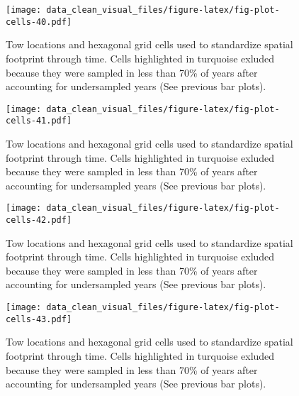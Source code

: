 \documentclass[
]{article}
\begin{document}
\begin{figure}
\centering
\texttt{[image: data\_clean\_visual\_files/figure-latex/fig-plot-cells-40.pdf]}
\caption{\label{fig:fig-plot-cells-40}Tow locations and hexagonal grid cells used to standardize spatial footprint through time. Cells highlighted in turquoise exluded because they were sampled in less than 70\% of years after accounting for undersampled years (See previous bar plots).}
\end{figure}

\begin{figure}
\centering
\texttt{[image: data\_clean\_visual\_files/figure-latex/fig-plot-cells-41.pdf]}
\caption{\label{fig:fig-plot-cells-41}Tow locations and hexagonal grid cells used to standardize spatial footprint through time. Cells highlighted in turquoise exluded because they were sampled in less than 70\% of years after accounting for undersampled years (See previous bar plots).}
\end{figure}

\begin{figure}
\centering
\texttt{[image: data\_clean\_visual\_files/figure-latex/fig-plot-cells-42.pdf]}
\caption{\label{fig:fig-plot-cells-42}Tow locations and hexagonal grid cells used to standardize spatial footprint through time. Cells highlighted in turquoise exluded because they were sampled in less than 70\% of years after accounting for undersampled years (See previous bar plots).}
\end{figure}

\begin{figure}
\centering
\texttt{[image: data\_clean\_visual\_files/figure-latex/fig-plot-cells-43.pdf]}
\caption{\label{fig:fig-plot-cells-43}Tow locations and hexagonal grid cells used to standardize spatial footprint through time. Cells highlighted in turquoise exluded because they were sampled in less than 70\% of years after accounting for undersampled years (See previous bar plots).}
\end{figure}
\end{document}

